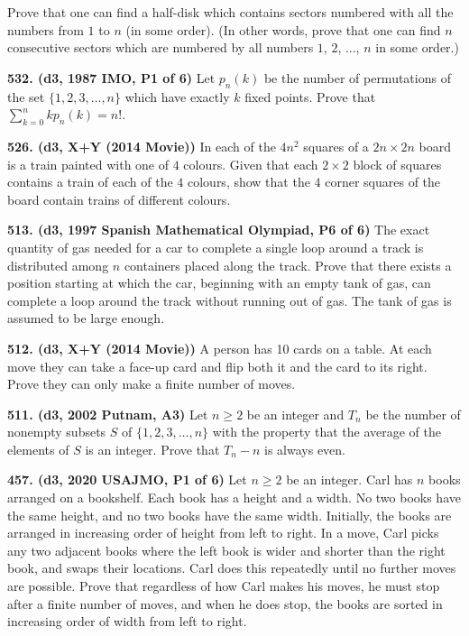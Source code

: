 \documentclass{article}
\begin{document}
        Prove that one can find a half-disk which contains sectors numbered with all the numbers from $ 1$ to $ n$ (in some order). (In other words, prove that one can find $ n$ consecutive sectors which are numbered by all numbers $ 1$, $ 2$, ..., $ n$ in some order.)


        \textbf{532. (\color{red}d3\color{black}, 1987 IMO, P1 of 6)} Let $p_n(k)$ be the number of permutations of the set $\{1,2,3,\ldots,n\}$ which have exactly $k$ fixed points. Prove that $\sum_{k=0}^nk p_n(k)=n!$.

        \textbf{526. (\color{red}d3\color{black}, X+Y (2014 Movie))} In each of the $4n^2$ squares of a $2n \times 2n$ board is a train painted with one of $4$ colours. Given that each $2 \times 2$ block of squares contains a train of each of the $4$ colours, show that the $4$ corner squares of the board contain trains of different colours.

        \textbf{513. (\color{red}d3\color{black}, 1997 Spanish Mathematical Olympiad, P6 of 6)} The exact quantity of gas needed for a car to complete a single loop around a track is distributed among $n$ containers placed along the track. Prove that there exists a position starting at which the car, beginning with an empty tank of gas, can complete a loop around the track without running out of gas. The tank of gas is assumed to be large enough.

        \textbf{512. (\color{red}d3\color{black}, X+Y (2014 Movie))} A person has 10 cards on a table. At each move they can take a face-up card and flip both it and the card to its right. Prove they can only make a finite number of moves.

        \textbf{511. (\color{red}d3\color{black}, 2002 Putnam, A3)} Let $n \geq 2$ be an integer and $T_{n}$ be the number of nonempty subsets $S$ of $\{1,2,3, \ldots, n\}$ with the property that the average of the elements of $S$ is an integer. Prove that $T_{n}-n$ is always even.

        \textbf{457. (\color{red}d3\color{black}, 2020 USAJMO, P1 of 6)} Let $n \geq 2$ be an integer. Carl has $n$ books arranged on a bookshelf. Each book has a height and a width. No two books have the same height, and no two books have the same width. Initially, the books are arranged in increasing order of height from left to right. In a move, Carl picks any two adjacent books where the left book is wider and shorter than the right book, and swaps their locations. Carl does this repeatedly until no further moves are possible. Prove that regardless of how Carl makes his moves, he must stop after a finite number of moves, and when he does stop, the books are sorted in increasing order of width from left to right.
\end{document}
